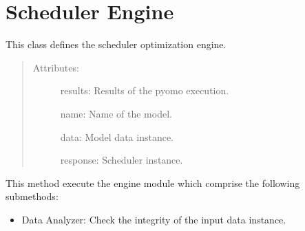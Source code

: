 \documentclass[letterpaper,10pt,english]{sphinxmanual}
\begin{document}
\section{Scheduler Engine}
\label{\detokenize{index:module-src.engine}}\label{\detokenize{index:scheduler-engine}}\label{\detokenize{index:module-2}}

\begin{fulllineitems}
\label{\detokenize{index:src.engine.SchedulerEngine}}
\sphinxAtStartPar
{}

\sphinxAtStartPar
This class defines the scheduler optimization engine.
\begin{quote}
\begin{description}
\item[{Attributes:}] \leavevmode
\sphinxAtStartPar
results:     Results of the pyomo execution.

\sphinxAtStartPar
name:        Name of the model.

\sphinxAtStartPar
data:        Model data instance.

\sphinxAtStartPar
response:    Scheduler instance.

\end{description}
\end{quote}

\begin{fulllineitems}
\label{\detokenize{index:src.engine.SchedulerEngine.execute}}
\sphinxAtStartPar
{}

\sphinxAtStartPar
This method execute the engine module which comprise the following sub\sphinxhyphen{}methods:
\begin{itemize}
\item {} 
\sphinxAtStartPar
Data Analyzer: Check the integrity of the input data instance.


\end{itemize}
\end{fulllineitems}
\end{fulllineitems}
\end{document}

